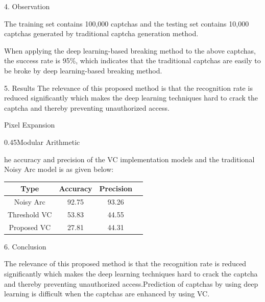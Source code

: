 \documentclass[
    landscape,      %
    paperwidth = 1120mm,
    paperheight = 950mm,
    fontscale = 0.30,
    margin = 1.7cm,
]{baposter}
\begin{document}
\begin{poster}
\begin{posterbox}[column=1, below=auto ]{4. Observation}
% 
\hspace{0.1cm}

The training set contains 100,000 captchas and the testing set contains 10,000 captchas generated
by traditional captcha generation method.

%
\hspace{0.1cm}

When applying the deep learning-based breaking method to the above captchas, the success
rate is 95\%, which indicates that the traditional captchas are easily to be broke by deep learning-based
breaking method.





\end{posterbox}

\begin{posterbox}[column=2,]{5. Results}
The relevance of this proposed method is that the recognition rate is reduced significantly which makes the deep learning techniques hard to crack the captcha and thereby preventing unauthorized access.


{Pixel Expansion}

{0.45\textwidth}{Modular Arithmetic}


he accuracy and precision of the VC implementation models and the traditional Noisy Arc model is as given below:


\begin{center}

\begin{tabular}{||c c c c||} 
 \hline
 Type & Accuracy & Precision &\\ [0.5ex] 
 \hline\hline
 Noisy Arc & 92.75 & 93.26 & \\ 
 \hline
 Threshold VC & 53.83 & 44.55 & \\
 \hline
 Proposed VC & 27.81 & 44.31 & \\
 \hline
\end{tabular}
\end{center}

\end{posterbox}

\begin{posterbox}[column=2,below=auto]{6. Conclusion}

The relevance of this proposed method is that the recognition rate is reduced significantly which makes the deep learning techniques hard to crack the captcha and thereby preventing unauthorized access.Prediction of captchas by using deep learning is difficult when the captchas are enhanced by using VC.
%
\hspace{0.1cm}


\end{posterbox}
\end{poster}
\end{document}
